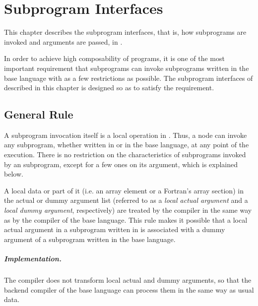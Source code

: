 \chapter{Subprogram Interfaces}

This chapter describes the subprogram interfaces, that is, how
subprograms are invoked and arguments are passed, in {\XMP}.

In order to achieve high composability of {\XMP} programs, it is one of
the most important requirement that {\XMP} subprograms can invoke
subprograms written in the base language with as a few restrictions as
possible. The subprogram interfaces of {\XMP} described in this chapter
is designed so as to satisfy the requirement.


\section{General Rule}

A subprogram invocation itself is a local operation in {\XMP}. Thus, a
node can invoke any subprogram, whether written in {\XMP} or in the base
language, at any point of the execution.
%
There is no restriction on the characteristics of subprograms invoked by
an {\XMP} subprogram, except for a few ones on its argument, which is
explained below.

A local data or part of it (i.e. an array element or a Fortran's array
section) in the actual or dummy argument list (referred to as a {\it
local actual argument} and a {\it local dummy argument}, respectively)
are treated by the {\XMP} compiler in the same way as by the compiler of
the base language.
%
This rule makes it possible that a local actual argument in a subprogram
written in {\XMP} is associated with a dummy argument of a subprogram
written in the base language.

\paragraph{Implementation.}

The {\XMP} compiler does not transform local actual and dummy arguments,
so that the backend compiler of the base language can process them in
the same way as usual data.

\vspace{1.5zw}

